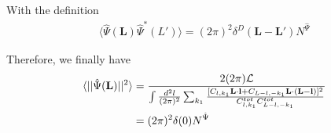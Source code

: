 \documentclass[12pt]{article}
\newcommand{\beq}{\begin{equation}}
\newcommand{\eeq}{\end{equation}}
\newcommand{\beqal}{\begin{aligned}}
\newcommand{\eeqal}{\end{aligned}}
\def\l{{\bf l}}
\def\L{{\bf L}}
\def\d2l{\frac{d^2l}{(2\pi)^2}}
\def\dko{\frac{dk_1}{2\pi}}
\numberwithin{equation}{section}
\begin{document}
%
%
%
%
With the definition
\begin{eqnarray}
\langle \hat{\Psi}(\textbf{L}) \hat{\Psi}^*(L') \rangle  = (2\pi)^2 \delta^D(\textbf{L} - \textbf{L}') N^{\hat{\Psi}}
\end{eqnarray}

Therefore, we finally have
\beq
\beqal
\langle ||\hat{\Psi}(\L)||^2\rangle 
& =   \frac{2 (2\pi) \mathcal{L}}{\int \frac{d^2 l}{(2\pi)^2} \sum_{k_1} \frac{[C_{l,k_1} \L\cdot \l +
		C_{L-l,-k_1} \L\cdot (\L-\l)]^2}{C^{tot}_{l,k_1}C^{tot}_{L-l,-k_1}} }
\\
& = (2\pi)^2 \delta(0) N^{\hat{\Psi}}
\eeqal
\eeq
\end{document}
